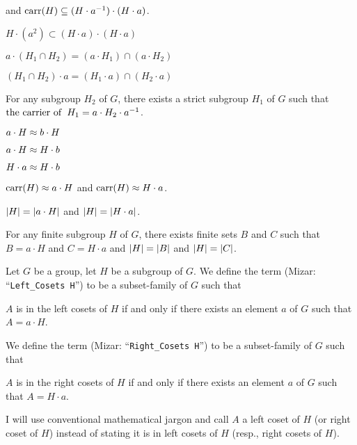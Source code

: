 \documentclass{article}
\begin{document}
\begin{thm}
  and $\operatorname{carr}(H)\subseteq(H\cdot a^{-1})\cdot(H\cdot a)$.
\item\label{group2:124} $H\cdot(a^{2})\subset(H\cdot a)\cdot(H\cdot a)$
\item\label{group2:125} $a\cdot(H_{1}\cap H_{2})=(a\cdot H_{1})\cap(a\cdot H_{2})$
\item\label{group2:126} $(H_{1}\cap H_{2})\cdot a=(H_{1}\cdot a)\cap(H_{2}\cdot a)$
\item\label{group2:127} For any subgroup $H_{2}$ of $G$,
  there exists a strict subgroup $H_{1}$ of $G$
  such that $\operatorname{the\ carrier\ of\ }H_{1}=a\cdot H_{2}\cdot a^{-1}$.
\item\label{group2:128} $a\cdot H\approx b\cdot H$
\item\label{group2:129} $a\cdot H\approx H\cdot b$
\item\label{group2:130} $H\cdot a\approx H\cdot b$
\item\label{group2:131} $\operatorname{carr}(H)\approx a\cdot H$ and
  $\operatorname{carr}(H)\approx H\cdot a$.
\item\label{group2:132} $|H|=|a\cdot H|$ and
  $|H|=|H\cdot a|$.
\item\label{group2:133} For any finite subgroup $H$ of $G$, there exists
  finite sets $B$ and $C$ such that $B=a\cdot H$ and $C=H\cdot a$ and
  $|H|=|B|$ and $|H|=|C|$.
\end{thm}

\begin{definition}
Let $G$ be a group, let $H$ be a subgroup of $G$.
We define the term  (Mizar: ``\verb#Left_Cosets H#'')
to be a subset-family of $G$ such that
\begin{defn}
\item $A$ is in the left cosets of $H$ if and only if there exists an
  element $a$ of $G$ such that $A=a\cdot H$.
\end{defn}
We define the term  (Mizar: ``\verb#Right_Cosets H#'')
to be a subset-family of $G$ such that
\begin{defn}
\item $A$ is in the right cosets of $H$ if and only if there exists an
  element $a$ of $G$ such that $A=H\cdot a$.
\end{defn}
\end{definition}

\begin{remark}
I will use conventional mathematical jargon and call $A$ a left coset of
$H$ (or right coset of $H$) instead of stating it is in left cosets of $H$
(resp., right cosets of $H$).
\end{remark}
\end{document}
